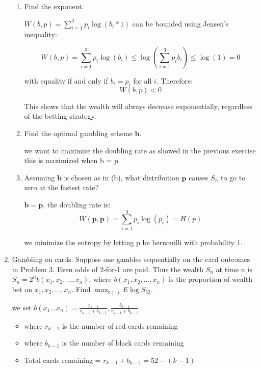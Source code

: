 \documentclass{article}
\begin{document}
\begin{enumerate}
    \begin{enumerate}
        \item Find the exponent.
        
        $W(b, p) = \sum_{i=1}^{3} p_i \log(b_i*1)$ can be bounded using Jensen's inequality:
        
        \[
            W(b, p) = \sum_{i=1}^{3} p_i \log(b_i) \leq \log(\sum_{i=1}^{3} p_i b_i) \leq \log(1) = 0
        \]
        
        with equality if and only if $b_i = p_i$ for all $i$. Therefore:
        \[
            W(b, p) < 0
        \]
        
        This shows that the wealth will always decrease exponentially, regardless of the betting strategy.

        \item Find the optimal gambling scheme $\mathbf{b}$.
        
        we want to maximize the doubling rate as showed in the previous exercise this is maximized when b = p

        \item Assuming $\mathbf{b}$ is chosen as in (b), what distribution $\mathbf{p}$ causes $S_n$ to go to zero at the fastest rate?
        
        $\mathbf{b} = \mathbf{p}$, the doubling rate is:
        \[
            W(\mathbf{p}, \mathbf{p}) = \sum_{i=1}^3 p_i \log(p_i) = H(p)
        \]
        
        we minimize the entropy by letting p be bernouilli with probability 1.
    \end{enumerate}

    \item Gambling on cards. Suppose one gambles sequentially on the card outcomes in Problem 3. Even odds of 2-for-1 are paid. Thus the wealth $S_n$ at time $n$ is $S_n = 2^n b(x_1, x_2, \ldots, x_n)$, where $b(x_1, x_2, \ldots, x_n)$ is the proportion of wealth bet on $x_1, x_2, \ldots, x_n$. Find $\max_{b(\cdot)} E \log S_{52}$.
    
    we set $b(x_1 \dots x_n) = {
        \frac{r_{k-1}}{r_{k-1}+b_{k-1}}, \frac{b_{k-1}}{r_{k-1}+b_{k-1}} 
    }$ 
    \begin{itemize}
        \item where $r_{k-1}$ is the number of red cards remaining
        \item where $b_{k-1}$ is the number of black cards remaining
        \item Total cards remaining = $r_{k-1} + b_{k-1} = 52-(k-1)$
    \end{itemize}
    

\end{enumerate}
\end{document}
